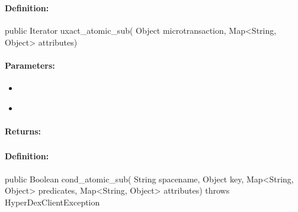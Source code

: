 \subsubsection{}
\label{api:java:uxact_atomic_sub}


\paragraph{Definition:}
\begin{javacode}
public Iterator uxact_atomic_sub(
        Object microtransaction,
        Map<String, Object> attributes)
\end{javacode}

\paragraph{Parameters:}
\begin{itemize}[noitemsep]
\item {}\\

\item {}\\

\end{itemize}

\paragraph{Returns:}


\pagebreak
\subsubsection{}
\label{api:java:cond_atomic_sub}


\paragraph{Definition:}
\begin{javacode}
public Boolean cond_atomic_sub(
        String spacename,
        Object key,
        Map<String, Object> predicates,
        Map<String, Object> attributes) throws HyperDexClientException
\end{javacode}

